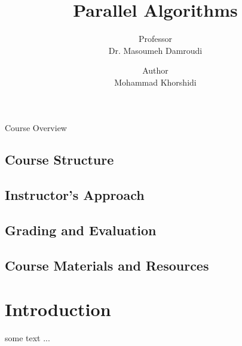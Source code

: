 \documentclass[a4paper, 10pt]{book}
\title{\huge {\bold Parallel Algorithms}}
\author{Professor\\{\bold Dr. Masoumeh Damroudi}}
\date{Author\\{\bold Mohammad Khorshidi}}
\begin{document}
    \maketitle
    \newpage

    \begin{center}
        \Large {\bold Course Overview}
    \end{center}

    \section{Course Structure}

    \section{Instructor's Approach}

    \section{Grading and Evaluation}

    \section{Course Materials and Resources}

    \tableofcontents
    
    \chapter{{\bold Introduction}}


        some text ...
\end{document}

